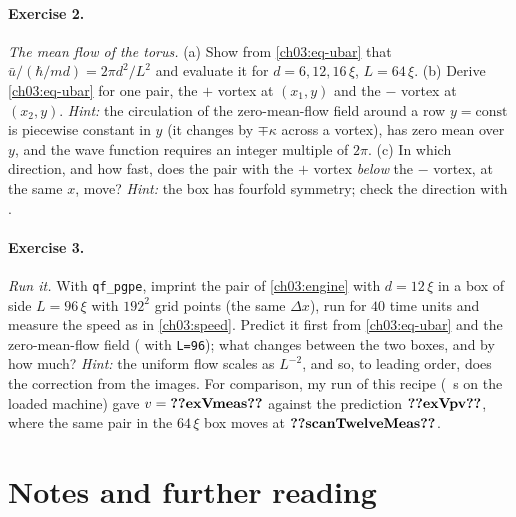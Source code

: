 \paragraph{Exercise 2.} \emph{The mean flow of the torus.} (a) Show from \eqref{ch03:eq-ubar} that $\bar u/(\hbar/md)=2\pi d^2/L^2$ and evaluate it for $d=6,12,16\,\xi$, $L=64\,\xi$. (b) Derive \eqref{ch03:eq-ubar} for one pair, the $+$ vortex at $(x_1,y)$ and the $-$ vortex at $(x_2,y)$. \emph{Hint:} the circulation of the zero-mean-flow field around a row $y=\text{const}$ is piecewise constant in $y$ (it changes by $\mp\kappa$ across a vortex), has zero mean over $y$, and the wave function requires an integer multiple of $2\pi$. (c) In which direction, and how fast, does the pair with the $+$ vortex \emph{below} the $-$ vortex, at the same $x$, move? \emph{Hint:} the box has fourfold symmetry; check the direction with .

\paragraph{Exercise 3.} \emph{Run it.} With \texttt{qf\_pgpe}, imprint the pair of \cref{ch03:engine} with $d=12\,\xi$ in a box of side $L=96\,\xi$ with $192^2$ grid points (the same $\Delta x$), run for $40$ time units and measure the speed as in \cref{ch03:speed}. Predict it first from \eqref{ch03:eq-ubar} and the zero-mean-flow field ( with \texttt{L=96}); what changes between the two boxes, and by how much? \emph{Hint:} the uniform flow scales as $L^{-2}$, and so, to leading order, does the correction from the images. For comparison, my run of this recipe (~s on the loaded machine) gave $v=\cthreeNum{exVmeas}$ against the prediction $\cthreeNum{exVpv}$, where the same pair in the $64\,\xi$ box moves at $\cthreeNum{scanTwelveMeas}$.

\section*{Notes and further reading}

